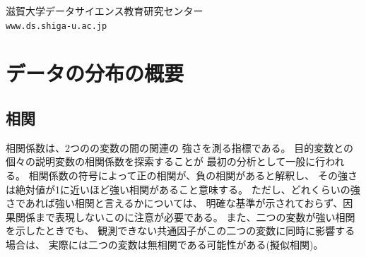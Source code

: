 \documentclass[a4j,11pt,mc]{jreport}
\newcommand{\tb}[1]{\textcolor{blue}{#1}} %
\begin{document}


{
}
{滋賀大学データサイエンス教育研究センター\\ \texttt{www.ds.shiga-u.ac.jp}}

\tableofcontents
\thispagestyle{empty}
\newpage






%
%
%

\chapter{データの分布の概要}\label{chapter:Descriptive}

\section{相関}

相関係数は、2つのの変数の間の関連の
強さを測る指標である。
目的変数との個々の説明変数の相関係数を探索することが
最初の分析として一般に行われる。
相関係数の符号によって正の相関が、負の相関があると解釈し、
その強さは絶対値が1に近いほど強い相関があること意味する。
ただし、どれくらいの強さであれば強い相関と言えるかについては、
明確な基準が示されておらず、因果関係まで表現しないこのに注意が必要である。
また、二つの変数が強い相関を示したときでも、
観測できない共通因子がこの二つの変数に同時に影響する場合は、
実際には二つの変数は無相関である可能性がある(擬似相関)。
\end{document}
